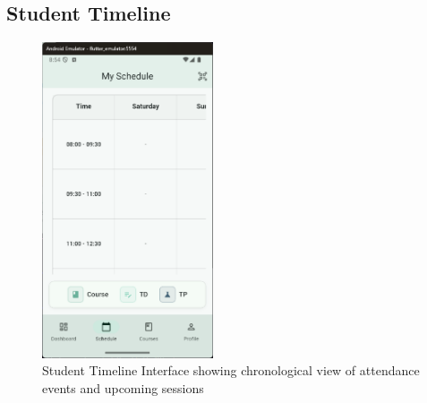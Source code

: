 \subsection{Student Timeline}\nopagebreak[4]
\vspace{0.5cm}
\begin{figure}[H]
    \centering
    \includegraphics[width=0.45\textwidth]{images/rachid/student-side-timeline.png}
    \caption{Student Timeline Interface showing chronological view of attendance events and upcoming sessions}
    \label{fig:student-timeline}
\end{figure}
